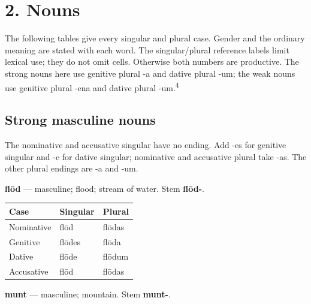 \section*{2. Nouns}

The following tables give every singular and plural case. Gender and the ordinary meaning are stated with each word. The singular/\allowbreak{}plural reference labels limit lexical use; they do not omit cells. Otherwise both numbers are productive. The strong nouns here use genitive plural -a and dative plural -um; the weak nouns use genitive plural -ena and dative plural -um.\textsuperscript{4}

\subsection*{Strong masculine nouns}

The nominative and accusative singular have no ending. Add -es for genitive singular and -e for dative singular; nominative and accusative plural take -as. The other plural endings are -a and -um.

\textbf{flōd} — masculine; flood; stream of water. Stem \textbf{flōd-}.

\par\begingroup
\fontsize{10.5}{13.2}\selectfont
\setlength{\LTleft}{0pt}\setlength{\LTright}{\fill}
\noindent
\begin{tabular}{@{}>{\raggedright\arraybackslash}p{39.46mm}>{\raggedright\arraybackslash}p{39.46mm}>{\raggedright\arraybackslash}p{39.46mm}@{}}
\toprule
\textbf{Case} & \textbf{Singular} & \textbf{Plural} \\
\midrule
Nominative & flōd & flōdas \\
Genitive & flōdes & flōda \\
Dative & flōde & flōdum \\
Accusative & flōd & flōdas \\
\bottomrule
\end{tabular}
\par\endgroup

\textbf{munt} — masculine; mountain. Stem \textbf{munt-}.

